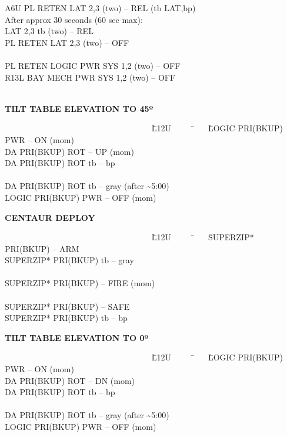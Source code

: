 \documentclass[Space_Shuttle_Vessel_Manual.tex]{subfiles}
\begin{document}
{\begin{tabbing}
\>A6U\>\> PL RETEN LAT 2,3 (two) -- REL (tb LAT,bp)\\
\>\>\> After approx 30 seconds (60 sec max):\\
\>\>\> LAT 2,3 tb (two) -- REL\\
\>\>\> PL RETEN LAT 2,3 (two) -- OFF\\\\

\>\>\> PL RETEN LOGIC PWR SYS 1,2 (two) -- OFF\\
\>R13L\>\> BAY MECH PWR SYS 1,2 (two) -- OFF\\\\
\end{tabbing}

\noindent
\hspace{100pt}\textbf{TILT TABLE ELEVATION TO 45º}
\begin{tabbing}
~~~~~~~~~~~~~~~~~~~~~~~~~~~~~~~~~~~ \= L12U~~~~~ \= ~~ \= LOGIC PRI(BKUP) PWR -- ON (mom)\\
\>\>\> DA PRI(BKUP) ROT -- UP (mom)\\
\>\>\> DA PRI(BKUP) ROT tb -- bp\\\\
\>\>\> DA PRI(BKUP) ROT tb -- gray (after \textasciitilde5:00)\\
\>\>\> LOGIC PRI(BKUP) PWR -- OFF (mom)\\
\end{tabbing}

\newpage
\noindent
\hspace{100pt}\textbf{CENTAUR DEPLOY}
\begin{tabbing}
~~~~~~~~~~~~~~~~~~~~~~~~~~~~~~~~~~~ \= L12U~~~~~ \= ~~ \= SUPERZIP* PRI(BKUP) -- ARM\\
\>\>\> SUPERZIP* PRI(BKUP) tb -- gray\\\\
\>\>\> SUPERZIP* PRI(BKUP) -- FIRE (mom)\\\\
\>\>\> SUPERZIP* PRI(BKUP) -- SAFE\\
\>\>\> SUPERZIP* PRI(BKUP) tb -- bp\\
\end{tabbing}

\noindent
\hspace{100pt}\textbf{TILT TABLE ELEVATION TO 0º}
\begin{tabbing}
~~~~~~~~~~~~~~~~~~~~~~~~~~~~~~~~~~~ \= L12U~~~~~ \= ~~ \= LOGIC PRI(BKUP) PWR -- ON (mom)\\
\>\>\> DA PRI(BKUP) ROT -- DN (mom)\\
\>\>\> DA PRI(BKUP) ROT tb -- bp\\\\
\>\>\> DA PRI(BKUP) ROT tb -- gray (after \textasciitilde5:00)\\
\>\>\> LOGIC PRI(BKUP) PWR -- OFF (mom)\\
\end{tabbing}

}
\end{document}
